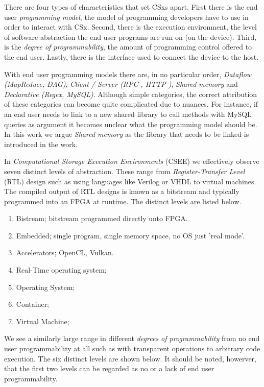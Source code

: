 There are four types of characteristics that set CSxs apart. First there is
the end user \textit{programming model}, the model of programming developers
have to use in order to interact with CSx. Second, there is the execution
environment, the level of software abstraction the end user programs are run on
(on the device). Third, is the \textit{degree of programmability}, the amount of
programming control offered to the end user. Lastly, there is the interface used
to connect the device to the host.

With end user programming models there are, in no particular order,
\textit{Dataflow (MapReduce, DAG)}, \textit{Client / Server
(RPC \footnotemark[1], HTTP \footnotemark[2])}, \textit{Shared memory} and
\textit{Declarative (Regex, MySQL)}. Although simple categories, the correct
attribution of these categories can become quite complicated due to nuances. For
instance, if an end user needs to link to a new shared library to call methods
with MySQL queries as argument it becomes unclear what the programming model
should be. In this work we argue \textit{Shared memory} as the library that
needs to be linked is introduced in the work.



In \textit{Computational Storage Execution Environments} (CSEE) we effectively
observe seven distinct levels of abstraction. These range from
\textit{Register-Transfer Level} (RTL) design such as using languages like
Verilog or VHDL to virtual machines. The compiled output of RTL designs is known
as a bitstream and typically programmed into an FPGA at runtime. The distinct
levels are listed below.

\begin{enumerate}
    \item Bistream; bitstream programmed directly unto FPGA.
    \item Embedded; single program, single memory space, no OS just 'real mode'.
    \item Accelerators; OpenCL, Vulkan.
    \item Real-Time operating system;
    \item Operating System;
    \item Container;
    \item Virtual Machine;
\end{enumerate}

We see a similarly large range in different \textit{degrees of programmability}
from no end user programmability at all such as with transparent operations to
arbitrary code execution. The six distinct levels are shown below. It
should be noted, howerver, that the first two levels can be regarded as no or a
lack of end user programmability.

